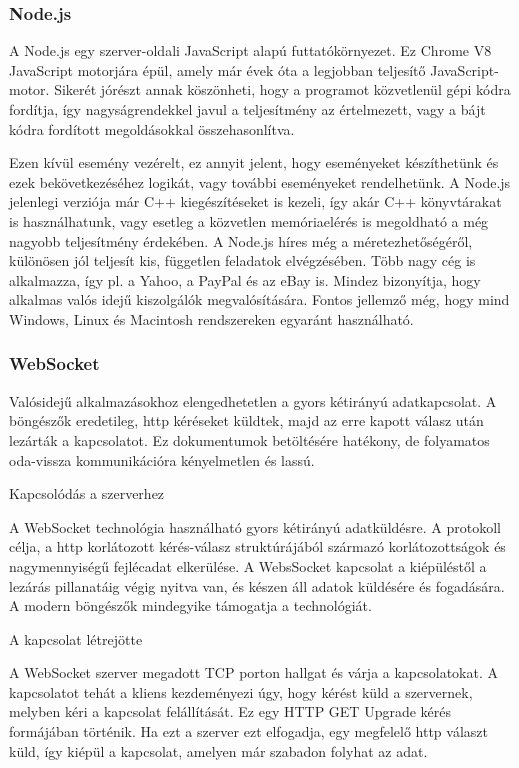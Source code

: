\documentclass[]{article}
\begin{document}
\hypertarget{node.js}{%
\subsubsection{Node.js}\label{node.js}}

A Node.js egy szerver-oldali JavaScript alapú futtatókörnyezet. Ez
Chrome V8 JavaScript motorjára épül, amely már évek óta a legjobban
teljesítő JavaScript-motor. Sikerét jórészt annak köszönheti, hogy a
programot közvetlenül gépi kódra fordítja, így nagyságrendekkel javul a
teljesítmény az értelmezett, vagy a bájt kódra fordított megoldásokkal
összehasonlítva.

Ezen kívül esemény vezérelt, ez annyit jelent, hogy eseményeket
készíthetünk és ezek bekövetkezéséhez logikát, vagy további eseményeket
rendelhetünk. A Node.js jelenlegi verziója már C++ kiegészítéseket is
kezeli, így akár C++ könyvtárakat is használhatunk, vagy esetleg a
közvetlen memóriaelérés is megoldható a még nagyobb teljesítmény
érdekében. A Node.js híres még a méretezhetőségéről, különösen jól
teljesít kis, független feladatok elvégzésében. Több nagy cég is
alkalmazza, így pl. a Yahoo, a PayPal és az eBay is. Mindez bizonyítja,
hogy alkalmas valós idejű kiszolgálók megvalósítására. Fontos jellemző
még, hogy mind Windows, Linux és Macintosh rendszereken egyaránt
használható.

\hypertarget{websocket}{%
\subsubsection{WebSocket}\label{websocket}}

Valósidejű alkalmazásokhoz elengedhetetlen a gyors kétirányú
adatkapcsolat. A böngészők eredetileg, http kéréseket küldtek, majd az
erre kapott válasz után lezárták a kapcsolatot. Ez dokumentumok
betöltésére hatékony, de folyamatos oda-vissza kommunikációra
kényelmetlen és lassú.

Kapcsolódás a szerverhez

A WebSocket technológia használható gyors kétirányú adatküldésre. A
protokoll célja, a http korlátozott kérés-válasz struktúrájából származó
korlátozottságok és nagymennyiségű fejlécadat elkerülése. A WebsSocket
kapcsolat a kiépüléstől a lezárás pillanatáig végig nyitva van, és
készen áll adatok küldésére és fogadására. A modern böngészők mindegyike
támogatja a technológiát.

A kapcsolat létrejötte

A WebSocket szerver megadott TCP porton hallgat és várja a
kapcsolatokat. A kapcsolatot tehát a kliens kezdeményezi úgy, hogy
kérést küld a szervernek, melyben kéri a kapcsolat felállítását. Ez egy
HTTP GET Upgrade kérés formájában történik. Ha ezt a szerver ezt
elfogadja, egy megfelelő http választ küld, így kiépül a kapcsolat,
amelyen már szabadon folyhat az adat.
\end{document}

